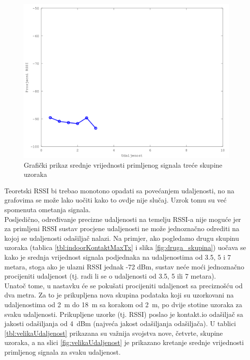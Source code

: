 \begin{figure}[H]
    \centering
    \includegraphics[scale=0.62]{pictures/treca-skupina-uzoraka}
    \caption{Grafički prikaz srednje vrijednosti primljenog signala treće skupine uzoraka}
    \label{fig:treca_skupina}
\end{figure}

Teoretski RSSI bi trebao monotono opadati sa povećanjem udaljenosti, no na grafovima se može lako uočiti kako to ovdje nije slučaj. 
Uzrok tomu su već spomenuta ometanja signala.
\\
Posljedično, određivanje precizne udaljenosti na temelju RSSI-a nije moguće jer za primljeni RSSI sustav procjene udaljenosti ne može jednoznačno odrediti na kojoj se udaljenosti odašiljač nalazi. 
Na primjer, ako pogledamo drugu skupinu uzoraka (tablica \ref{tbl:indoorKontaktMaxTx} i slika \ref{fig:druga_skupina}) uočava se kako je srednja vrijednost signala podjednaka na udaljenostima od 3.5, 5 i 7 metara, stoga ako je ulazni RSSI jednak -72 dBm, sustav neće moći jednoznačno procijeniti udaljenost (tj. radi li se o udaljenosti od 3.5, 5 ili 7 metara).
\\

Unatoč tome, u nastavku će se pokušati procijeniti udaljenost sa preciznošću od dva metra. 
Za to je prikupljena nova skupina podataka koji su uzorkovani na udaljenostima od \SI{2}{m} do \SI{18}{m} sa korakom od \SI{2}{m}, po dvije stotine uzoraka za svaku udaljenosti. 
Prikupljene uzorke (tj. RSSI) poslao je kontakt.io odašiljač sa jakosti odašiljanja od \SI{4}{dBm} (najveća jakost odašiljanja odašiljača). 
U tablici \ref{tbl:velikaUdaljenost} prikazana su važnija svojstva nove, četvrte, skupine uzoraka, a na slici \ref{fig:velikaUdaljenost} je prikazano kretanje srednje vrijednosti primljenog signala za svaku udaljenost.

